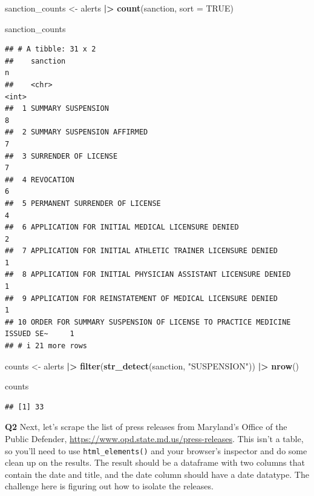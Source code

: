 \documentclass[
]{article}
\newenvironment{Shaded}{\begin{snugshade}}{\end{snugshade}}
\newcommand{\AttributeTok}[1]{\textcolor[rgb]{0.13,0.29,0.53}{#1}}
\newcommand{\ConstantTok}[1]{\textcolor[rgb]{0.56,0.35,0.01}{#1}}
\newcommand{\FunctionTok}[1]{\textcolor[rgb]{0.13,0.29,0.53}{\textbf{#1}}}
\newcommand{\NormalTok}[1]{#1}
\newcommand{\OtherTok}[1]{\textcolor[rgb]{0.56,0.35,0.01}{#1}}
\newcommand{\SpecialCharTok}[1]{\textcolor[rgb]{0.81,0.36,0.00}{\textbf{#1}}}
\newcommand{\StringTok}[1]{\textcolor[rgb]{0.31,0.60,0.02}{#1}}
\begin{document}
\begin{Shaded}
\begin{Highlighting}[]
\NormalTok{sanction\_counts }\OtherTok{\textless{}{-}}\NormalTok{ alerts }\SpecialCharTok{|\textgreater{}}
  \FunctionTok{count}\NormalTok{(sanction, }\AttributeTok{sort =} \ConstantTok{TRUE}\NormalTok{)}

\NormalTok{sanction\_counts}
\end{Highlighting}
\end{Shaded}

\begin{verbatim}
## # A tibble: 31 x 2
##    sanction                                                                    n
##    <chr>                                                                   <int>
##  1 SUMMARY SUSPENSION                                                          8
##  2 SUMMARY SUSPENSION AFFIRMED                                                 7
##  3 SURRENDER OF LICENSE                                                        7
##  4 REVOCATION                                                                  6
##  5 PERMANENT SURRENDER OF LICENSE                                              4
##  6 APPLICATION FOR INITIAL MEDICAL LICENSURE DENIED                            2
##  7 APPLICATION FOR INITIAL ATHLETIC TRAINER LICENSURE DENIED                   1
##  8 APPLICATION FOR INITIAL PHYSICIAN ASSISTANT LICENSURE DENIED                1
##  9 APPLICATION FOR REINSTATEMENT OF MEDICAL LICENSURE DENIED                   1
## 10 ORDER FOR SUMMARY SUSPENSION OF LICENSE TO PRACTICE MEDICINE ISSUED SE~     1
## # i 21 more rows
\end{verbatim}

\begin{Shaded}
\begin{Highlighting}[]
\NormalTok{counts }\OtherTok{\textless{}{-}}\NormalTok{ alerts }\SpecialCharTok{|\textgreater{}}
  \FunctionTok{filter}\NormalTok{(}\FunctionTok{str\_detect}\NormalTok{(sanction, }\StringTok{"SUSPENSION"}\NormalTok{)) }\SpecialCharTok{|\textgreater{}}
  \FunctionTok{nrow}\NormalTok{()}

\NormalTok{counts}
\end{Highlighting}
\end{Shaded}

\begin{verbatim}
## [1] 33
\end{verbatim}

\textbf{Q2} Next, let's scrape the list of press releases from
Maryland's Office of the Public Defender,
\url{https://www.opd.state.md.us/press-releases}. This isn't a table, so
you'll need to use \texttt{html\_elements()} and your browser's
inspector and do some clean up on the results. The result should be a
dataframe with two columns that contain the date and title, and the date
column should have a date datatype. The challenge here is figuring out
how to isolate the releases.
\end{document}

